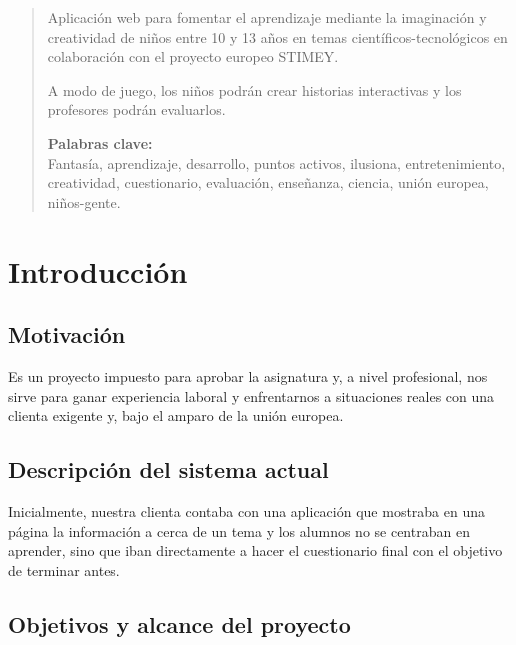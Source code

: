 \documentclass[12pt,letterpaper]{article}
\begin{document}
	\begin{abstract} %
		Aplicación web para fomentar el aprendizaje mediante la imaginación y creatividad de niños entre 10 y 13 años en temas científicos-tecnológicos en colaboración con el proyecto europeo STIMEY.
		
		A modo de juego, los niños podrán crear historias interactivas y los profesores podrán evaluarlos.
		
		\textbf{Palabras clave:}\\
		Fantasía, aprendizaje, desarrollo, puntos activos, ilusiona, entretenimiento, creatividad, cuestionario, evaluación, enseñanza, ciencia, unión europea, niños-gente.
	\end{abstract}

	\thispagestyle{empty}
	\newpage
	
	\tableofcontents
	\newpage
	
	
	
	
	\lstset{language=bash, numbers=left, numberstyle=\tiny, numbersep=10pt, firstnumber=1, stepnumber=1, basicstyle=\small\ttfamily, tabsize=1, extendedchars=true, inputencoding=latin1}

\section{Introducción}
\subsection{Motivación}
Es un proyecto impuesto para aprobar la asignatura y, a nivel profesional, nos sirve para ganar experiencia laboral y enfrentarnos a situaciones reales con una clienta exigente y, bajo el amparo de la unión europea.

\subsection{Descripción del sistema actual}
Inicialmente, nuestra clienta contaba con una aplicación que mostraba en una página la información a cerca de un tema y los alumnos no se centraban en aprender, sino que iban directamente a hacer el cuestionario final con el objetivo de terminar antes.

\subsection{Objetivos y alcance del proyecto}
\end{document}
